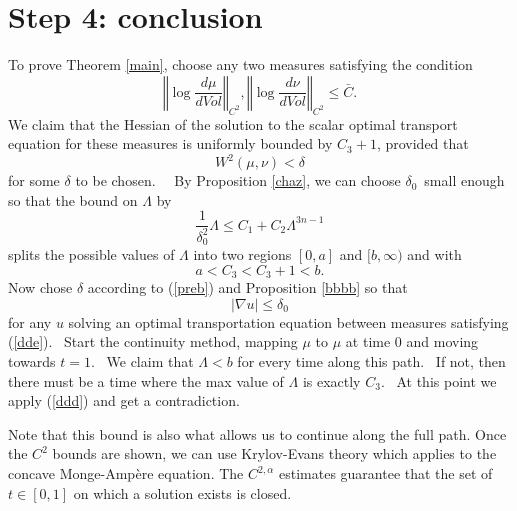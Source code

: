 \documentclass[11pt,letterpaper]{amsart}%
\numberwithin{equation}{section}
\begin{document}
\section{Step 4: conclusion}

To prove Theorem \ref{main}, choose any two measures satisfying the condition
\[
\left\Vert \log\frac{d\mu}{dVol}\right\Vert _{C^{2}},\left\Vert \log\frac
{d\nu}{dVol}\right\Vert _{C^{2}}\leq\bar{C}.
\]
We claim that the Hessian of the solution to the scalar optimal transport equation for these measures is uniformly bounded by $C_3+1$,
provided that
\begin{equation}
W^{2}(\mu,\nu)<\delta\label{dde}%
\end{equation}
for some $\delta$ to be chosen. \ \ By Proposition \ref{chaz}, we can choose
$\delta_{0}$\ small enough so that the bound on $\Lambda$ by
\begin{equation}
\frac{1}{\delta_{0}^{2}}\Lambda\leq C_{1}+C_{2}\Lambda^{3n-1} \label{ddd}%
\end{equation}
splits the possible values of $\Lambda$ into two regions $\left[  0,a\right]
$ and $[b,\infty)$ and with
\[
a<C_{3}< C_3+1< b.
\]
Now chose $\delta$ according to (\ref{preb}) and Proposition \ref{bbbb} so
that
\[
\left\vert \nabla u\right\vert \leq\delta_{0}%
\]
for any $u$ solving an optimal transportation equation between measures
satisfying (\ref{dde}). \ Start the continuity method, mapping $\mu$ to $\mu$
at time $0$ and moving towards $t=1.$ \ We claim that $\Lambda<b$ for every
time along this path. \ If not, then there must be a time where the max value
of $\Lambda$ is exactly $C_{3}.$ \ At this point we apply (\ref{ddd}) and get
a contradiction. \ 

Note that this bound is also what allows us to continue along the full path.  Once the $C^2$ bounds are shown, we can use Krylov-Evans theory which applies to the concave Monge-Amp\`ere equation.    The $C^{2,\alpha}$ estimates guarantee that the set of $t \in [0,1]$ on which a solution exists is closed.  



\end{document}
